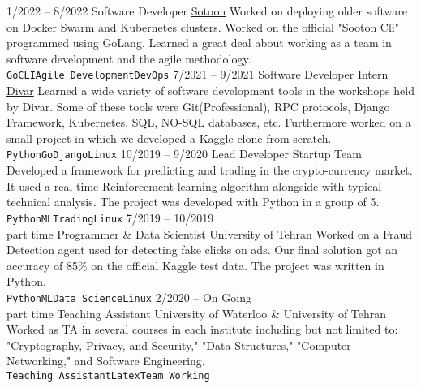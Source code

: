 \documentclass[9pt]{developercv} %
\begin{document}
\begin{entrylist}
	\entry
		{1/2022 -- 8/2022}
		{Software Developer}
		{\href{https://sotoon.ir}{Sotoon}}
		{Worked on deploying older software on Docker Swarm and Kubernetes clusters. Worked on the official "Sooton Cli" programmed using GoLang. Learned a great deal about working as a team in software development and the agile methodology.\\ \texttt{Go}\slashsep\texttt{CLI}\slashsep\texttt{Agile Development}\slashsep\texttt{DevOps}}
	\entry
		{7/2021 -- 9/2021}
		{Software Developer Intern}
		{\href{https://divar.ir}{Divar}}
		{Learned a wide variety of software development tools in the workshops held by Divar. Some of these tools were Git(Professional), RPC protocols, Django Framework, Kubernetes, SQL, NO-SQL databases, etc. Furthermore worked on a small project in which we developed a \href{https://github.com/kamali-sina/mini-kaggle}{Kaggle clone} from scratch.\\ \texttt{Python}\slashsep\texttt{Go}\slashsep\texttt{Django}\slashsep\texttt{Linux}}
	\entry
		{10/2019 -- 9/2020}
		{Lead Developer}
		{Startup Team}
		{Developed a framework for predicting and trading in the crypto-currency market. It used a real-time Reinforcement learning algorithm alongside with typical technical analysis. The project was developed with Python in a group of 5.\\ \texttt{Python}\slashsep\texttt{ML}\slashsep\texttt{Trading}\slashsep\texttt{Linux}}
	\entry
		{7/2019 -- 10/2019\\\footnotesize{part time}}
		{Programmer \& Data Scientist}
		{University of Tehran}
		{Worked on a Fraud Detection agent used for detecting fake clicks on ads. Our final solution got an accuracy of 85\% on the official Kaggle test data. The project was written in Python. \\ \texttt{Python}\slashsep\texttt{ML}\slashsep\texttt{Data Science}\slashsep\texttt{Linux} }
	\entry
		{2/2020 -- On Going\\\footnotesize{part time}}
		{Teaching Assistant}
		{University of Waterloo \& University of Tehran}
		{Worked as TA in several courses in each institute including but not limited to: "Cryptography, Privacy, and Security," "Data Structures," "Computer Networking," and Software Engineering.   \\ \texttt{Teaching Assistant}\slashsep\texttt{Latex}\slashsep\texttt{Team Working}}
\end{entrylist}
\end{document}
